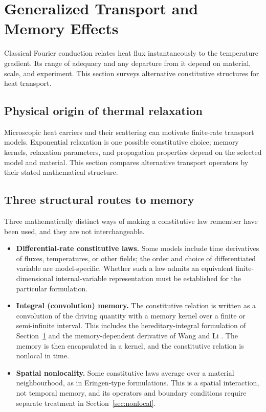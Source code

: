 \section{Generalized Transport and Memory Effects}
\label{sec:transport}

Classical Fourier conduction relates heat flux instantaneously to the temperature gradient. Its range of adequacy and any departure from it depend on material, scale, and experiment. This section surveys alternative constitutive structures for heat transport.

\subsection{Physical origin of thermal relaxation}

Microscopic heat carriers and their scattering can motivate finite-rate transport models. Exponential relaxation is one possible constitutive choice; memory kernels, relaxation parameters, and propagation properties depend on the selected model and material. This section compares alternative transport operators by their stated mathematical structure.

\subsection{Three structural routes to memory}

Three mathematically distinct ways of making a constitutive law remember have been used, and they are not interchangeable.

\begin{itemize}
\item \textbf{Differential-rate constitutive laws.} Some models include time derivatives of fluxes, temperatures, or other fields; the order and choice of differentiated variable are model-specific. Whether such a law admits an equivalent finite-dimensional internal-variable representation must be established for the particular formulation.
\item \textbf{Integral (convolution) memory.} The constitutive relation is written as a convolution of the driving quantity with a memory kernel over a finite or semi-infinite interval. This includes the hereditary-integral formulation of Section~\ref{sec:transport} and the memory-dependent derivative of Wang and Li \cite{Wang2011}. The memory is then encapsulated in a kernel, and the constitutive relation is nonlocal in time.
\item \textbf{Spatial nonlocality.} Some constitutive laws average over a material neighbourhood, as in Eringen-type formulations. This is a spatial interaction, not temporal memory, and its operators and boundary conditions require separate treatment in Section~\ref{sec:nonlocal}.
\end{itemize}

